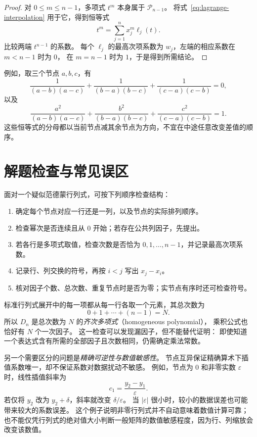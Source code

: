 \documentclass[UTF8,12pt,a4paper,fontset=fandol]{ctexart}
\begin{document}
\begin{proof}
对 $0\leq m\leq n-1$，多项式 $t^m$ 本身属于 $\mathcal P_{n-1}$。
将式~\eqref{eq:lagrange-interpolation} 用于它，得到恒等式
\[
  t^m=\sum_{j=1}^n x_j^m\ell_j(t).
\]
比较两端 $t^{n-1}$ 的系数。
每个 $\ell_j$ 的最高次项系数为 $w_j$，左端的相应系数在 $m<n-1$ 时为 $0$，
在 $m=n-1$ 时为 $1$，于是得到所需结论。
\end{proof}

例如，取三个节点 $a,b,c$，有
\[
  \frac{1}{(a-b)(a-c)}+
  \frac{1}{(b-a)(b-c)}+
  \frac{1}{(c-a)(c-b)}=0,
\]
以及
\[
  \frac{a^2}{(a-b)(a-c)}+
  \frac{b^2}{(b-a)(b-c)}+
  \frac{c^2}{(c-a)(c-b)}=1.
\]
这些恒等式的分母都以当前节点减其余节点为方向，不宜在中途任意改变差值的顺序。

\section{解题检查与常见误区}

面对一个疑似范德蒙行列式，可按下列顺序检查结构：
\begin{enumerate}
  \item 确定每个节点对应一行还是一列，以及节点的实际排列顺序。
  \item 检查幂次是否连续且从 $0$ 开始；若存在公共列因子，先提出。
  \item 若各行是多项式取值，检查次数是否恰为 $0,1,\ldots,n-1$，并记录最高次项系数。
  \item 记录行、列交换的符号，再按 $i<j$ 写出 $x_j-x_i$。
  \item 核对因子个数、总次数、重复节点时是否为零；实节点有序时还可检查符号。
\end{enumerate}

标准行列式展开中的每一项都从每一行各取一个元素，其总次数为
\[
  0+1+\cdots+(n-1)=N.
\]
所以 $D_n$ 是总次数为 $N$ 的\emph{齐次多项式}（homogeneous polynomial），
乘积公式也恰好有 $N$ 个一次因子。
这一检查可以发现漏因子，但不能替代证明：
即使知道一个表达式含有所需的全部因子且次数相同，仍需确定乘法常数。

另一个需要区分的问题是\emph{精确可逆性与数值敏感性}。
节点互异保证精确算术下插值系数唯一，却不保证系数对数据扰动不敏感。
例如，节点为 $0$ 和非零实数 $\varepsilon$ 时，线性插值斜率为
\[
  c_1=\frac{y_2-y_1}{\varepsilon}.
\]
若仅将 $y_2$ 改为 $y_2+\delta$，斜率就改变 $\delta/\varepsilon$。
当 $|\varepsilon|$ 很小时，较小的数据误差也可能带来较大的系数误差。
这个例子说明非零行列式并不自动意味着数值计算可靠；
也不能仅凭行列式的绝对值大小判断一般矩阵的数值敏感程度，因为行、列缩放会改变该数值。
\end{document}
